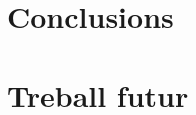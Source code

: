 \documentclass{tfgitic}[2024/07/01]
\begin{document}
\chapter{Conclusions}

\chapter{Treball futur}


\end{document}
